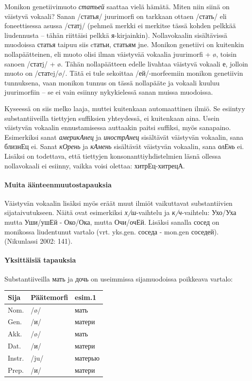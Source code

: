 \documentclass[]{scrartcl}
\begin{document}
Monikon genetiivimuoto \emph{статьей} saattaa vielä hämätä. Miten niin
siinä on väistyvä vokaali? Sanan /статья/ juurimorfi on tarkkaan ottaen
/стать/ eli foneettisessa asussa /статj/ (pehmeä merkki ei merkitse
tässä kohden pelkkää liudennusta -- tähän riittäisi pelkkä
я-kirjainkin). Nollavokaalin sisältävissä muodoissa статья taipuu siis
cтатьи, статьям jne. Monikon genetiivi on kuitenkin nollapäätteinen, eli
muoto olisi ilman väistyvää vokaalia juurimorfi + ø, toisin sanoen
/статj/ + ø. Tähän nollapäätteen edelle livahtaa väistyvä vokaali е,
jolloin muoto on /статej/ø/. Tätä ei tule sekoittaa /ей/-morfeemiin
monikon genetiivin tunnuksena, vaan monikon tunnus on tässä nollapääte
ja vokaali kuuluu juurimorfiin -- se ei vain esiinny nykykielessä sanan
muissa muodoissa.

Kyseessä on siis melko laaja, muttei kuitenkaan automaattinen ilmiö. Se
esiintyy substantiiveilla tiettyjen suffiksien yhteydessä, ei kuitenkaan
aina. Usein väistyvän vokaalin ennustamisessa auttaakin paitsi suffiksi,
myös sanapaino. Esimerkiksi sanat \emph{америкАнец} ja \emph{инострАнец}
sisältävät väistyvän vokaalin, sana близнЕц ei. Sanat \emph{кОрень} ja
\emph{кАмень} sisältävät väistyvän vokaalin, sana \emph{олЕнь} ei.
Lisäksi on todettava, että tiettyjen konsonanttiyhdistelmien läsnä
ollessa nollavokaali ei esiinny, vaikka voisi olettaa: хитрЕц-хитрецА.

\paragraph{Muita
äänteenmuutostapauksia}\label{muita-uxe4uxe4nteenmuutostapauksia}

Väistyvän vokaalin lisäksi myös eräät muut ilmiöt vaikuttavat
substantiivien sijataivutukseen. Näitä ovat esimerkiksi
\emph{х/ш}-vaihtelu ja \emph{к/ч}-vaihtelu: Ухо/Уха mutta Уши/ушЕй -
Око/Ока, mutta Очи/очЕй. Lisäksi sanalla сосед on monikossa liudentunut
vartalo (vrt. yks.gen. соседа - mon.gen соседей). (Nikunlassi 2002:
141).

\paragraph{Yksittäisiä tapauksia}\label{yksittuxe4isiuxe4-tapauksia}

Substantiiveilla мать ja дочь on useimmissa sijamuodoissa poikkeava
vartalo:

\begin{longtable}[c]{@{}lll@{}}
\toprule
Sija & Päätemorfi & esim.1\tabularnewline
\midrule
\endhead
Nom. & /ø/ & мать\tabularnewline
Gen. & /и/ & матери\tabularnewline
Akk. & /ø/ & мать\tabularnewline
Dat. & /и/ & матери\tabularnewline
Instr. & /ju/ & матерью\tabularnewline
Prep. & /и/ & матери\tabularnewline
\bottomrule
\end{longtable}
\end{document}
